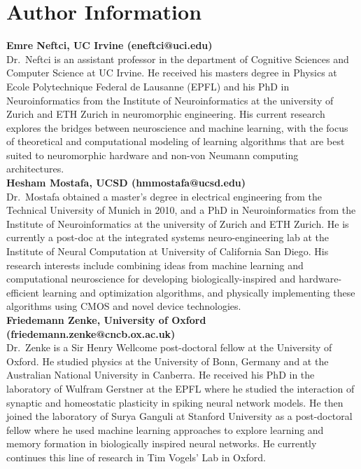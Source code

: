 \documentclass[journal,onecolumn,11pt]{IEEEtran}
\begin{document}
\section{Author Information}
\textbf{Emre Neftci, UC Irvine (eneftci@uci.edu)}\\
Dr.~Neftci is an assistant professor in the department of Cognitive Sciences and Computer Science at UC Irvine. He received his masters degree in Physics at Ecole Polytechnique Federal de Lausanne (EPFL) and his PhD in Neuroinformatics from the Institute of Neuroinformatics at the university of Zurich and ETH Zurich in neuromorphic engineering. His current research explores the bridges between neuroscience and machine learning, with the focus of theoretical and computational modeling of learning algorithms that are best suited to neuromorphic hardware and non-von Neumann computing architectures.\\

\textbf{Hesham Mostafa, UCSD (hmmostafa@ucsd.edu)}\\
Dr.~Mostafa obtained a master's degree in electrical engineering from the Technical University of Munich in 2010, and a PhD in Neuroinformatics from the Institute of Neuroinformatics at the university of Zurich and ETH Zurich. He is currently a post-doc at the integrated systems neuro-engineering lab at the Institute of Neural Computation at University of California San Diego. His research interests include combining ideas from machine learning and computational neuroscience for developing biologically-inspired and hardware-efficient learning and optimization algorithms, and physically implementing these algorithms using CMOS and novel device technologies.  \\

\textbf{Friedemann Zenke, University of Oxford (friedemann.zenke@cncb.ox.ac.uk)}\\
Dr.~Zenke is a Sir Henry Wellcome post-doctoral fellow at the University of Oxford.
He studied physics at the University of Bonn, Germany and at the Australian National University in Canberra. He received his PhD in the laboratory of Wulfram Gerstner at the EPFL where he studied the interaction of synaptic and homeostatic plasticity in spiking neural network models. He then joined the laboratory of Surya Ganguli at Stanford University as a post-doctoral fellow where he used machine learning approaches to explore learning and memory formation in biologically inspired neural networks. He currently continues this line of research in Tim Vogels' Lab in Oxford.
\end{document}
